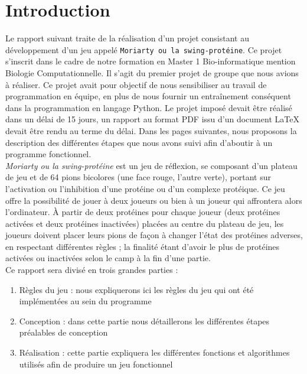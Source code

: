 
\setcounter{page}{0}
\thispagestyle{empty}
\tableofcontents
\newpage
 
\section{Introduction}

Le rapport suivant traite de la réalisation d'un projet consistant au développement d'un jeu appelé \verb|Moriarty ou la swing-protéine|. Ce projet s'inscrit dans le cadre de notre formation en Master 1 Bio-informatique mention Biologie Computationnelle. Il s'agit du premier projet de groupe que nous avions à réaliser. Ce projet avait pour objectif de nous sensibiliser au travail de programmation en équipe, en plus de nous fournir un entraînement conséquent dans la programmation en langage Python. Le projet imposé devait être réalisé dans un délai de 15 jours, un rapport au format PDF issu d'un document LaTeX devait être rendu au terme du délai. Dans les pages suivantes, nous proposons la description des différentes étapes que nous avons suivi afin d'aboutir à un programme fonctionnel.\\


\emph{Moriarty ou la swing-protéine} est un jeu de réflexion, se composant d'un plateau de jeu et de 64 pions bicolores (une face rouge, l'autre verte), portant sur l'activation ou l'inhibition d'une protéine ou d'un complexe protéique. Ce jeu offre la possibilité de jouer à deux joueurs ou bien à un joueur qui affrontera alors l'ordinateur. À partir de deux protéines pour chaque joueur (deux protéines activées et deux protéines inactivées) placées au centre du plateau de jeu, les joueurs doivent placer leurs pions de façon à changer l'état des protéines adverses, en respectant différentes règles ; la finalité étant d'avoir le plus de protéines activées ou inactivées selon le camp à la fin d'une partie.
\\Ce rapport sera divisé en trois grandes parties :
\begin{enumerate}
	\item Règles du jeu : nous expliquerons ici les règles du jeu qui ont été implémentées au sein du programme
	\item Conception : dans cette partie nous détaillerons les différentes étapes préalables de conception
	\item Réalisation : cette partie expliquera les différentes fonctions et algorithmes utilisés afin de produire un jeu fonctionnel
\end{enumerate}

